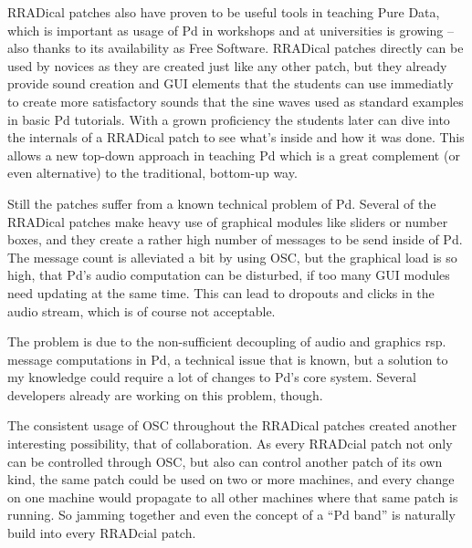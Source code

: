 \documentclass[10pt,english]{scrartcl}
\begin{document}
RRADical patches also have proven to be useful tools in teaching Pure Data,
which is important as usage of Pd in workshops and at universities is
growing -- also thanks to its availability as Free Software. RRADical
patches directly can be used by novices as they are created just like any
other patch, but they already provide sound creation and GUI elements that
the students can use immediatly to create more satisfactory sounds that the
sine waves used as standard examples in basic Pd tutorials. With a grown
proficiency the students later can dive into the internals of a RRADical
patch to see what's inside and how it was done.  This allows a new top-down
approach in teaching Pd which is a great complement (or even alternative) to
the traditional, bottom-up way.

Still the patches suffer from a known technical problem of Pd. Several of
the RRADical patches make heavy use of graphical modules like sliders or
number boxes, and they create a rather high number of messages to be send
inside of Pd. The message count is alleviated a bit by using OSC, but the
graphical load is so high, that Pd's audio computation can be disturbed, if
too many GUI modules need updating at the same time. This can lead to
dropouts and clicks in the audio stream, which is of course not acceptable.

The problem is due to the non-sufficient decoupling of audio and graphics
rsp. message computations in Pd, a technical issue that is known, but a
solution to my knowledge could require a lot of changes to Pd's core system.
Several developers already are working on this problem, though.

The consistent usage of OSC throughout the RRADical patches created another
interesting possibility, that of collaboration. As every RRADcial patch not
only can be controlled through OSC, but also can control another patch of
its own kind, the same patch could be used on two or more machines, and
every change on one machine would propagate to all other machines where that
same patch is running. So jamming together and even the concept of a ``Pd
band'' is naturally build into every RRADcial patch.
\end{document}
